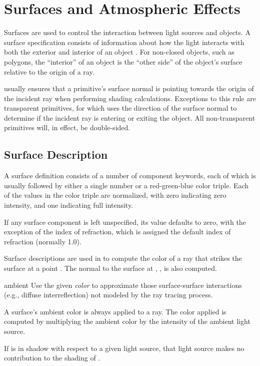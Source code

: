 \chapter{Surfaces and Atmospheric Effects}

Surfaces are used to control the interaction between light sources and
objects.  A surface specification consists of information
about how the light interacts with both the exterior and
interior of an object .
For non-closed objects, such as polygons,
the ``interior'' of an object is the ``other side'' of the object's surface
relative to the origin of a ray.

{\Rayshade} usually ensures that a primitive's surface normal is pointing
towards the origin of the incident ray when performing shading
calculations.  Exceptions to this rule are transparent primitives, for
which {\rayshade} uses the direction of the surface normal to determine if
the incident ray is entering or exiting the object.
All non-transparent primitives will, in effect, be double-sided.

\section{Surface Description}

A surface definition consists of a number of component keywords, each
of which is usually followed by either a single number or a red-green-blue
color triple.   Each of the values in the color triple are normalized,
with zero indicating zero intensity, and one indicating full intensity.

If any surface component is left unspecified, its value defaults to zero,
with the exception of the index of refraction, which is assigned the
default index of refraction (normally 1.0).

Surface descriptions are used in {\rayshade} to compute the color of a ray
that strikes the surface at a point . The normal to the surface
at , , is also computed.

\begin{defkey}{ambient}{}
	Use the given {\em color} to approximate those surface-surface 
	interactions (e.g., diffuse interreflection) not modeled by the
	ray tracing process.
\end{defkey}
A surface's ambient color is always applied to a ray.  The color
applied is computed by multiplying the ambient color by the intensity
of the ambient light source.

If  is in shadow with respect to a given light source,
that light source makes no contribution to the shading of .

